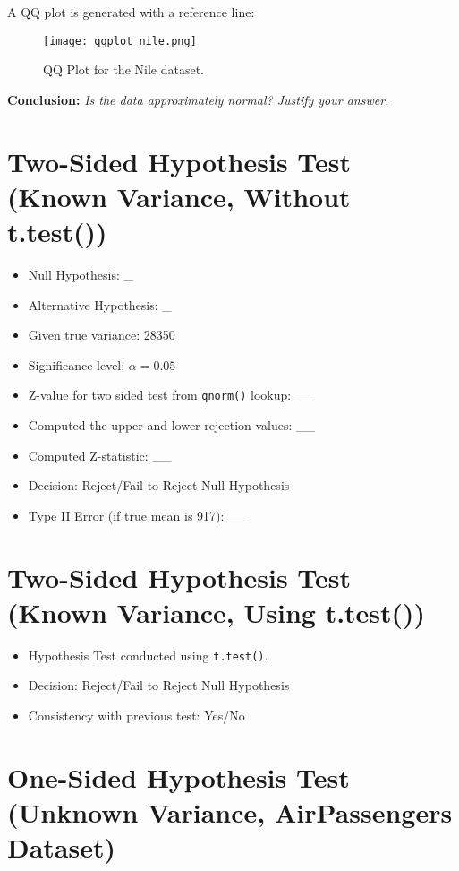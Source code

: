 \documentclass{article}
\begin{document}
A QQ plot is generated with a reference line:

\begin{figure}[H]
    \centering
    \texttt{[image: qqplot\_nile.png]} %
    \caption{QQ Plot for the Nile dataset.}
    \label{fig:qqplot_nile}
\end{figure}

\textbf{Conclusion:} \textit{Is the data approximately normal? Justify your answer.}

\section{Two-Sided Hypothesis Test (Known Variance, Without t.test())}

\begin{itemize}
    \item Null Hypothesis: \_
    \item Alternative Hypothesis: \_
    \item Given true variance: 28350
    \item Significance level: \(\alpha = 0.05\)
    \item Z-value for two sided test from \texttt{qnorm()} lookup: \_\_
    \item Computed the upper and lower rejection values: \_\_
    \item Computed Z-statistic: \_\_
    \item Decision: Reject/Fail to Reject Null Hypothesis
    \item Type II Error (if true mean is 917): \_\_
\end{itemize}

\section{Two-Sided Hypothesis Test (Known Variance, Using t.test())}

\begin{itemize}
    \item Hypothesis Test conducted using \texttt{t.test()}.
    \item Decision: Reject/Fail to Reject Null Hypothesis
    \item Consistency with previous test: Yes/No
\end{itemize}

\section{One-Sided Hypothesis Test (Unknown Variance, AirPassengers Dataset)}
\end{document}
